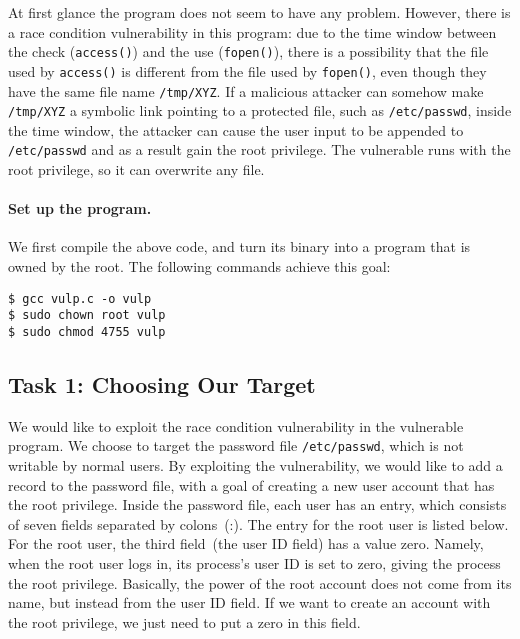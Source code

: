 At first glance the program does not seem to have any problem.
However, there is a race condition vulnerability in this program: due to the 
time window between the check ({\tt access()}) and 
the use ({\tt fopen()}), there is a possibility that the file used by
{\tt access()} is different from the file used by {\tt fopen()}, even
though they have the same file name {\tt /tmp/XYZ}.  If a malicious 
attacker can somehow make {\tt /tmp/XYZ} a symbolic link pointing to
a protected file, such as \texttt{/etc/passwd}, inside the time window, 
the attacker can cause the user input
to be appended to \texttt{/etc/passwd} and as a result gain the root
privilege. The vulnerable runs with the root privilege, so
it can overwrite any file.


\paragraph{Set up the \setuid program.}
We first compile the above code, and turn its binary into a \setuid program that is owned by the
root. The following commands achieve this goal:

\begin{lstlisting}
$ gcc vulp.c -o vulp
$ sudo chown root vulp
$ sudo chmod 4755 vulp
\end{lstlisting}



\subsection{Task 1: Choosing Our Target}

We would like to exploit the race condition vulnerability in
the vulnerable program.
We choose to target the password file \texttt{/etc/passwd}, which is not writable by
normal users. By exploiting the vulnerability, we would like to
add a record to the password file, with a goal of
creating a new user account that has the root privilege.
Inside the password file, each user has an entry, which consists of seven fields
separated by colons~(:). The entry for the root user is listed below.
For the root user, the third field~(the user ID field) has a value zero. Namely, when the root
user logs in, its process's user ID is set to zero, giving the process the root privilege.
Basically, the power of the root account does not come from its name, but instead from
the user ID field. If we want to create an account with the root privilege,
we just need to put a zero in this field.

